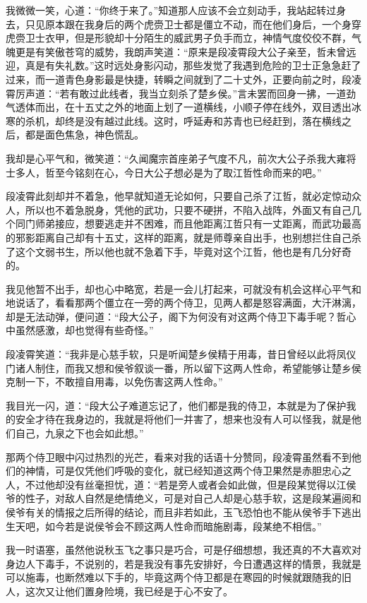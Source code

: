 我微微一笑，心道：“你终于来了。”知道那人应该不会立刻动手，我站起转过身去，只见原本跟在我身后的两个虎赍卫士都是僵立不动，而在他们身后，一个身穿虎赍卫士衣甲，但是形貌却十分陌生的威武男子负手而立，神情气度佼佼不群，气魄更是有笑傲苍穹的威势，我朗声笑道：“原来是段凌霄段大公子亲至，哲未曾远迎，真是有失礼数。”这时远处身影闪动，那些发觉了我遇到危险的卫士正急急赶了过来，而一道青色身影最是快捷，转瞬之间就到了二十丈外，正要向前之时，段凌霄厉声道：“若有敢过此线者，我当立刻杀了楚乡侯。”言未罢而回身一拂，一道劲气透体而出，在十五丈之外的地面上划了一道横线，小顺子停在线外，双目透出冰寒的杀机，却终是没有越过此线。这时，呼延寿和苏青也已经赶到，落在横线之后，都是面色焦急，神色慌乱。

我却是心平气和，微笑道：“久闻魔宗首座弟子气度不凡，前次大公子杀我大雍将士多人，哲至今铭刻在心，今日大公子想必是为了取江哲性命而来的吧。”

段凌霄此刻却并不着急，他早就知道无论如何，只要自己杀了江哲，就必定惊动众人，所以也不着急脱身，凭他的武功，只要不硬拼，不陷入战阵，外面又有自己几个同门师弟接应，想要逃走并不困难，而且他距离江哲只有一丈距离，而武功最高的邪影距离自己却有十五丈，这样的距离，就是师尊亲自出手，也别想拦住自己杀了这个文弱书生，所以他也就不急着下手，毕竟对这个江哲，他也是有几分好奇的。

我见他暂不出手，却也心中略宽，若是一会儿打起来，可就没有机会这样心平气和地说话了，看看那两个僵立在一旁的两个侍卫，见两人都是怒容满面，大汗淋漓，却是无法动弹，便问道：“段大公子，阁下为何没有对这两个侍卫下毒手呢？哲心中虽然感激，却也觉得有些奇怪。”

段凌霄笑道：“我非是心慈手软，只是听闻楚乡侯精于用毒，昔日曾经以此将凤仪门诸人制住，而我又想和侯爷叙谈一番，所以留下这两人性命，希望能够让楚乡侯克制一下，不敢擅自用毒，以免伤害这两人性命。”

我目光一闪，道：“段大公子难道忘记了，他们都是我的侍卫，本就是为了保护我的安全才待在我身边的，我就是将他们一并害了，想来也没有人可以怪我，就是他们自己，九泉之下也会如此想。”

那两个侍卫眼中闪过热烈的光芒，看来对我的话语十分赞同，段凌霄虽然看不到他们的神情，可是仅凭他们呼吸的变化，就已经知道这两个侍卫果然是赤胆忠心之人，不过他却没有丝毫担忧，道：“若是旁人或者会如此做，但是段某觉得以江侯爷的性子，对敌人自然是绝情绝义，可是对自己人却是心慈手软，这是段某遍阅和侯爷有关的情报之后所得的结论，而且非若如此，玉飞恐怕也不能从侯爷手下逃出生天吧，如今若是说侯爷会不顾这两人性命而暗施剧毒，段某绝不相信。”

我一时语塞，虽然他说秋玉飞之事只是巧合，可是仔细想想，我还真的不大喜欢对身边人下毒手，不说别的，若是我没有事先安排好，今日遭遇这样的情景，我就是可以施毒，也断然难以下手的，毕竟这两个侍卫都是在寒园的时候就跟随我的旧人，这次又让他们置身险境，我已经是于心不安了。

